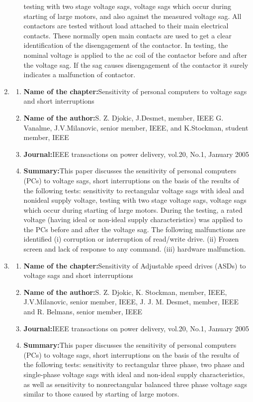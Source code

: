 \documentclass[14pt, a4paper]{extreport}
\begin{document}
\begin{enumerate}
\begin{enumerate}
testing with two stage
voltage sags, voltage sags
which occur during
starting of large motors,
and also against the
measured voltage sag. All
contactors are tested
without load attached to
their main electrical
contacts. These normally
open main contacts are
used to get a clear
identification of the
disengagement of the
contactor. In testing, the
nominal voltage is applied
to the ac coil of the
contactor before and after
the voltage sag. If the sag
causes disengagement of
the contactor it surely
indicates a malfunction of
contactor.
\end{enumerate}
\item
    \begin{enumerate}
     \item{\textbf{Name of the chapter:}}Sensitivity of
personal
computers to
voltage sags and
short
interruptions
\item{\textbf{Name of the author:}}S. Z. Djokic,
J.Desmet,
member, IEEE
G. Vanalme,
J.V.Milanovic,
senior member,
IEEE, and
K.Stockman,
student
member, IEEE
\item{\textbf{Journal:}}IEEE
transactions
on power
delivery,
vol.20, No.1,
January 2005
\item{\textbf{Summary:}}This paper discusses the
sensitivity of personal
computers (PCs) to
voltage sags, short
interruptions on the basis
of the results of the
following tests: sensitivity
to rectangular voltage
sags with ideal and nonideal
supply voltage,
testing with two stage
voltage sags, voltage sags
which occur during
starting of large motors.
During the testing, a
rated voltage (having ideal
or non-ideal supply
characteristics) was
applied to the PCs before
and after the voltage sag.
The following
malfunctions are identified
(i) corruption or
interruption of read/write
drive. (ii) Frozen screen
and lack of response to
any command. (iii)
hardware malfunction.
    \end{enumerate}
    \item
    \begin{enumerate}
    \item{\textbf{Name of the chapter:}}Sensitivity of
Adjustable speed
drives (ASDs) to
voltage sags and
short
interruptions
\item{\textbf{Name of the author:}}S. Z. Djokic,
K. Stockman,
member, IEEE,
J.V.Milanovic,
senior member,
IEEE,
J. J. M.
Desmet,
member, IEEE
and
R. Belmans,
senior member,
IEEE
\item{\textbf{Journal:}}IEEE
transactions
on power
delivery,
vol.20, No.1,
January 2005
\item{\textbf{Summary:}}This paper discusses the
sensitivity of personal
computers (PCs) to
voltage sags, short
interruptions on the basis
of the results of the
following tests: sensitivity
to rectangular three
phase, two phase and
single-phase voltage sags
with ideal and non-ideal
supply characteristics, as
well as sensitivity to nonrectangular
balanced three
phase voltage sags similar
to those caused by
starting of large motors.


\end{enumerate}
\end{enumerate}
\end{document}
